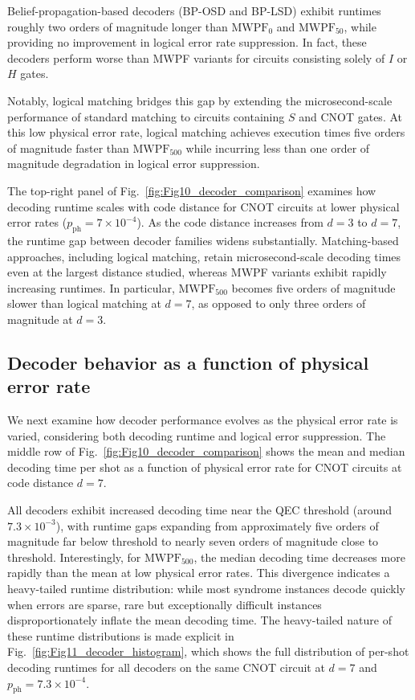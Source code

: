 \documentclass[aps, prx, reprint, superscriptaddress, longbibliography, floatfix]{revtex4-2}
\begin{document}
Belief-propagation-based decoders (BP-OSD and BP-LSD) exhibit runtimes roughly two orders of magnitude longer than $\text{MWPF}_0$ and $\text{MWPF}_{50}$, while providing no improvement in logical error rate suppression. In fact, these decoders perform worse than MWPF variants for circuits consisting solely of $I$ or $H$ gates.

Notably, logical matching bridges this gap by extending the microsecond-scale performance of standard matching to circuits containing $S$ and CNOT gates. At this low physical error rate, logical matching achieves execution times five orders of magnitude faster than $\text{MWPF}_{500}$ while incurring less than one order of magnitude degradation in logical error suppression.


The top-right panel of Fig.~\ref{fig:Fig10_decoder_comparison} examines how decoding runtime scales with code distance for CNOT circuits at lower physical error rates ($p_{\mathrm{ph}} = 7 \times 10^{-4}$). As the code distance increases from $d=3$ to $d=7$, the runtime gap between decoder families widens substantially. Matching-based approaches, including logical matching, retain microsecond-scale decoding times even at the largest distance studied, whereas MWPF variants exhibit rapidly increasing runtimes. In particular, $\text{MWPF}_{500}$ becomes five orders of magnitude slower than logical matching at $d=7$, as opposed to only three orders of magnitude at $d=3$.

\subsection{Decoder behavior as a function of physical error rate}
We next examine how decoder performance evolves as the physical error rate is varied, considering both decoding runtime and logical error suppression. The middle row of Fig.~\ref{fig:Fig10_decoder_comparison} shows the mean and median decoding time per shot as a function of physical error rate for CNOT circuits at code distance $d=7$.

All decoders exhibit increased decoding time near the QEC threshold (around $7.3 \times 10^{-3}$), with runtime gaps expanding from approximately five orders of magnitude far below threshold to nearly seven orders of magnitude close to threshold. Interestingly, for $\text{MWPF}_{500}$, the median decoding time decreases more rapidly than the mean at low physical error rates. This divergence indicates a heavy-tailed runtime distribution: while most syndrome instances decode quickly when errors are sparse, rare but exceptionally difficult instances disproportionately inflate the mean decoding time. The heavy-tailed nature of these runtime distributions is made explicit in Fig.~\ref{fig:Fig11_decoder_histogram}, which shows the full distribution of per-shot decoding runtimes for all decoders on the same CNOT circuit at $d=7$ and $p_{\mathrm{ph}} = 7.3 \times 10^{-4}$.
\end{document}
